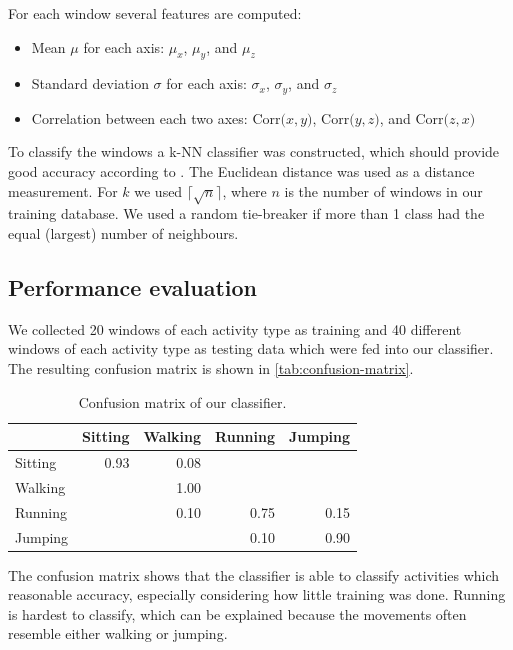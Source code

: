\documentclass[a4paper,10pt,twoside]{IEEEtran}
\begin{document}
For each window several features are computed:

\begin{itemize}
\item Mean $\mu$ for each axis: $\mu_x$, $\mu_y$, and $\mu_z$
\item Standard deviation $\sigma$ for each axis: $\sigma_x$, $\sigma_y$, and $\sigma_z$
\item Correlation between each two axes:  $\text{Corr(}x,y{)}$, $\text{Corr(}y,z{)}$, and $\text{Corr(}z,x{)}$
\end{itemize}

To classify the windows a k-NN classifier was constructed, which should provide good accuracy according to \cite{s100201154}.
The Euclidean distance was used as a distance measurement.
For $k$ we used  $\lceil\sqrt{n}\rceil$, where $n$ is the number of windows in our training database.
We used a random tie-breaker if more than 1 class had the equal (largest) number of neighbours. 

\subsection{Performance evaluation}
We collected 20 windows of each activity type as training and 40 different windows of each activity type as testing data which were fed into our classifier.
The resulting confusion matrix is shown in \autoref{tab:confusion-matrix}.

\begin{table}[ht]
\centering
\caption{Confusion matrix of our classifier.}
\begin{tabular}{lrrrr}
\toprule
& Sitting & Walking & Running & Jumping  \\
\midrule
Sitting & 0.93 &  0.08 &       &       \\
Walking &       & 1.00 &       &       \\
Running &       &  0.10 & 0.75 & 0.15 \\
Jumping &       &        & 0.10 & 0.90 \\
\bottomrule
\end{tabular}
\label{tab:confusion-matrix}
 \end{table}

The confusion matrix shows that the classifier is able to classify activities which reasonable accuracy, especially considering how little training was done.
Running is hardest to classify, which can be explained because the movements often resemble either walking or jumping.
\end{document}
